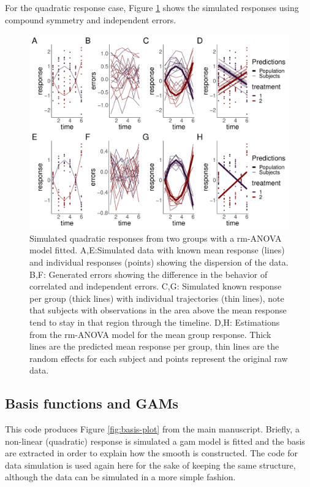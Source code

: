 \documentclass[
]{article}
\begin{document}
For the quadratic response case, Figure \ref{fig:quadratic-cases-Appendix} shows the simulated responses using compound symmetry and independent errors.



\begin{figure}[H]
\includegraphics{Full_document_files/figure-latex/quadratic-cases-Appendix-1} \caption{Simulated quadratic responses from two groups with a rm-ANOVA model fitted. A,E:Simulated data with known mean response (lines) and individual responses (points) showing the dispersion of the data. B,F: Generated errors showing the difference in the behavior of correlated and independent errors. C,G: Simulated known response per group (thick lines) with individual trajectories (thin lines), note that subjects with observations in the area above the mean response tend to stay in that region through the timeline. D,H: Estimations from the rm-ANOVA model for the mean group response. Thick lines are the predicted mean response per group, thin lines are the random effects for each subject and points represent the original raw data.}\label{fig:quadratic-cases-Appendix}
\end{figure}

\hypertarget{basis-functions-and-gams}{%
\subsection{Basis functions and GAMs}\label{basis-functions-and-gams}}

This code produces Figure \ref{fig:basis-plot} from the main manuscript. Briefly, a non-linear (quadratic) response is simulated a gam model is fitted and the basis are extracted in order to explain how the smooth is constructed. The code for data simulation is used again here for the sake of keeping the same structure, although the data can be simulated in a more simple fashion.
\end{document}
